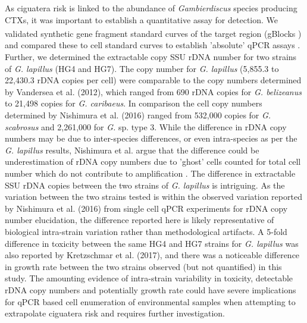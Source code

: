 \documentclass[12pt]{article}
\begin{document}
As ciguatera risk is linked to the abundance of \emph{Gambierdiscus} species producing CTXs, it was important to establish a quantitative assay for detection.
We validated synthetic gene fragment standard curves of the target region (gBlocks \textsuperscript{\textregistered}) and compared these to cell standard curves to establish 'absolute' qPCR assays \citep{nishimura2016quantitative,hariganeya2013quantitative}. 
Further, we determined the extractable copy SSU rDNA number for two strains of \emph{G. lapillus} (HG4 and HG7). %
The copy number for \emph{G. lapillus} (5,855.3 to 22,430.3 rDNA copies per cell) %
were comparable to the copy numbers determined by Vandersea et al. (2012), which ranged from 690 rDNA copies for \emph{G. belizeanus} to 21,498 copies for \emph{G. caribaeus}. 
In comparison the cell copy numbers determined by Nishimura et al. (2016) ranged from 532,000 copies for \emph{G. scabrosus} and 2,261,000 for \emph{G.} sp. type 3. While the difference in rDNA copy numbers may be due to inter-species differences, or even intra-species as per the \emph{G. lapillus} results, Nishimura et al. argue that the difference could be underestimation of rDNA copy numbers due to 'ghost' cells counted for total cell number which do not contribute to amplification \citep{nishimura2016quantitative,hariganeya2013quantitative}.
The difference in extractable SSU rDNA copies between the two strains of \emph{G. lapillus} is intriguing. 
As the variation between the two strains tested is within the observed variation reported by Nishimura et al. (2016) from single cell qPCR experiments for rDNA copy number elucidation, the difference reported here is likely representative of biological intra-strain variation rather than methodological artifacts. 
A 5-fold difference in toxicity between the same HG4 and HG7 strains for \emph{G. lapillus} was also reported by Kretzschmar et al. (2017), and there was a noticeable difference in growth rate between the two strains observed (but not quantified) in this study. 
The amounting evidence of intra-strain variability in toxicity, detectable rDNA copy numbers and potentially growth rate could have severe implications for qPCR based cell enumeration of environmental samples when attempting to extrapolate ciguatera risk and requires further investigation.\\
\end{document}
